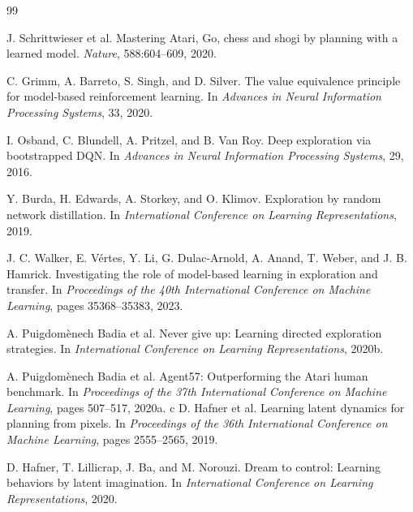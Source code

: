 \documentclass{article}
\begin{document}
\begin{thebibliography}{99}

J. Schrittwieser et al.
\newblock Mastering Atari, Go, chess and shogi by planning with a learned model.
\newblock \emph{Nature}, 588:604--609, 2020.

C. Grimm, A. Barreto, S. Singh, and D. Silver.
\newblock The value equivalence principle for model-based reinforcement learning.
\newblock In \emph{Advances in Neural Information Processing Systems}, 33, 2020.

I. Osband, C. Blundell, A. Pritzel, and B. Van Roy.
\newblock Deep exploration via bootstrapped DQN.
\newblock In \emph{Advances in Neural Information Processing Systems}, 29, 2016.

Y. Burda, H. Edwards, A. Storkey, and O. Klimov.
\newblock Exploration by random network distillation.
\newblock In \emph{International Conference on Learning Representations}, 2019.

J. C. Walker, E. V\'{e}rtes, Y. Li, G. Dulac-Arnold, A. Anand,
T. Weber, and J. B. Hamrick.
\newblock Investigating the role of model-based learning in exploration and transfer.
\newblock In \emph{Proceedings of the 40th International Conference on Machine Learning},
pages 35368--35383, 2023.

A. Puigdom\`enech Badia et al.
\newblock Never give up: Learning directed exploration strategies.
\newblock In \emph{International Conference on Learning Representations}, 2020b.

A. Puigdom\`enech Badia et al.
\newblock Agent57: Outperforming the Atari human benchmark.
\newblock In \emph{Proceedings of the 37th International Conference on Machine Learning}, pages 507--517, 2020a.
c
D. Hafner et al.
\newblock Learning latent dynamics for planning from pixels.
\newblock In \emph{Proceedings of the 36th International Conference on Machine Learning}, pages 2555--2565, 2019.

D. Hafner, T. Lillicrap, J. Ba, and M. Norouzi.
\newblock Dream to control: Learning behaviors by latent imagination.
\newblock In \emph{International Conference on Learning Representations}, 2020.


\end{thebibliography}
\end{document}
